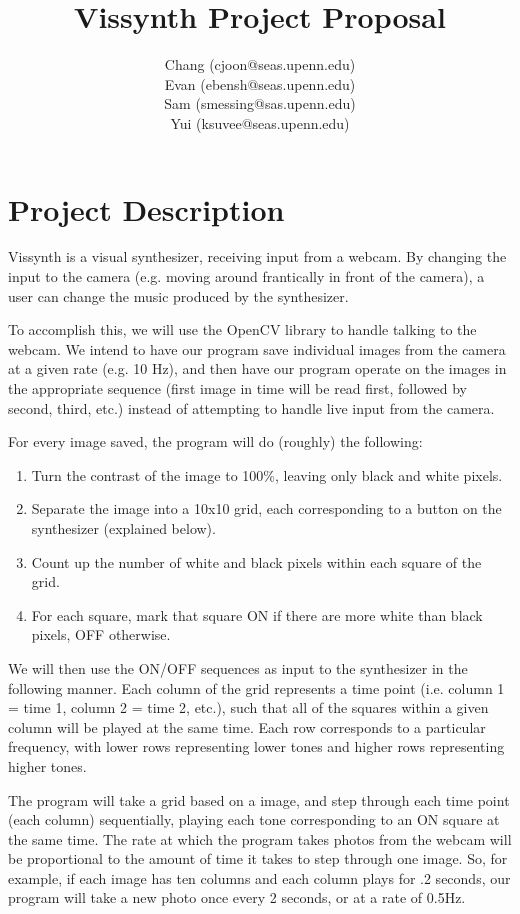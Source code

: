 \documentclass{article}
\title{Vissynth Project Proposal}
\author{Chang (cjoon@seas.upenn.edu) \\ Evan (ebensh@seas.upenn.edu) \\ Sam (smessing@sas.upenn.edu) \\ Yui (ksuvee@seas.upenn.edu)}
\begin{document}
\maketitle

\section{Project Description} %
\label{sec:project_description}

Vissynth is a visual synthesizer, receiving input from a webcam.
By changing the input to the camera (e.g. moving around
frantically in front of the camera), a user can change the music
produced by the synthesizer.

To accomplish this, we will use the OpenCV library to handle
talking to the webcam. We intend to have our program save
individual images from the camera at a given rate (e.g. 10 Hz),
and then have our program operate on the images in the appropriate
sequence (first image in time will be read first, followed by
second, third, etc.) instead of attempting to handle live input
from the camera.

For every image saved, the program will do (roughly) the
following:

\begin{enumerate}
  \item Turn the contrast of the image to 100\%, leaving only black and white pixels.
  \item Separate the image into a 10x10 grid, each corresponding to a button on the synthesizer (explained below).
  \item Count up the number of white and black pixels within each square of the grid.
  \item For each square, mark that square ON if there are more white than black pixels, OFF otherwise.
\end{enumerate}

We will then use the ON/OFF sequences as input to the synthesizer
in the following manner. Each column of the grid represents a time
point (i.e. column 1 = time 1, column 2 = time 2, etc.), such that
all of the squares within a given column will be played at the
same time. Each row corresponds to a particular frequency, with
lower rows representing lower tones and higher rows representing
higher tones.

The program will take a grid based on a image, and step through
each time point (each column) sequentially, playing each tone
corresponding to an ON square at the same time. The rate at which
the program takes photos from the webcam will be proportional to
the amount of time it takes to step through one image. So, for
example, if each image has ten columns and each column plays for
.2 seconds, our program will take a new photo once every 2
seconds, or at a rate of 0.5Hz.
\end{document}
